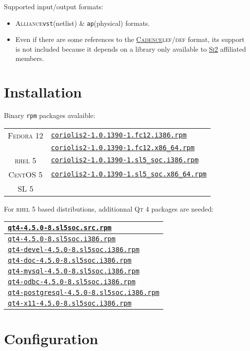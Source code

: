 \documentclass[11pt]{article}
\newcommand {\SiII}               {\href{http://www.si2.org/}{\textsc{Si2}}\xspace}
\newcommand {\Cadence}            {\href{http://www.cadence.com/}{\textsc{Cadence}}\xspace}
\newcommand {\LEFDEF}             {\textsc{lef/def}\xspace}
\newcommand {\RHELV}              {\textsc{rhel 5}\xspace}
\newcommand {\CentOSV}            {\textsc{CentOS 5}\xspace}
\newcommand {\SLV}                {\textsc{SL 5}\xspace}
\newcommand {\FedoraXII}          {\textsc{Fedora 12}\xspace}
\newcommand {\QtIV}               {\textsc{Qt 4}\xspace}
\newcommand {\rpm}                {\texttt{rpm}\xspace}
\newcommand {\Alliance}           {\textsc{Alliance}\xspace}
\newcommand {\vst}                {\texttt{vst}\xspace}
\newcommand {\ap}                 {\texttt{ap}\xspace}
\newcommand {\coriolisIIfcXIIirpm}%
     {\href{ftp://asim.lip6.fr/pub/coriolis/2.0/coriolis2-1.0.1390-1.fc12.i386.rpm}%
      {\texttt{coriolis2-1.0.1390-1.fc12.i386.rpm}\xspace}}
\newcommand {\coriolisIIfcXIIxrpm}%
     {\href{ftp://asim.lip6.fr/pub/coriolis/2.0/coriolis2-1.0.1390-1.fc12.x86\_64.rpm}%
      {\texttt{coriolis2-1.0.1390-1.fc12.x86\_64.rpm}\xspace}}
\newcommand {\coriolisIIslVirpm}%
     {\href{ftp://asim.lip6.fr/pub/coriolis/2.0/coriolis2-1.0.1390-1.sl5\_soc.i386.rpm}%
      {\texttt{coriolis2-1.0.1390-1.sl5\_soc.i386.rpm}\xspace}}
\newcommand {\coriolisIIslVxrpm}%
     {\href{ftp://asim.lip6.fr/pub/coriolis/2.0/coriolis2-1.0.1390-1.sl5\_soc.x86\_64.rpm}%
      {\texttt{coriolis2-1.0.1390-1.sl5\_soc.x86\_64.rpm}\xspace}}
\newcommand {\qtIVsrpm}%
     {\href{http://ftp.lip6.fr/pub/linux/distributions/slsoc/5x/SLSoC/SRPMS/SL/qt4-4.5.0-8.sl5soc.src.rpm}%
      {\texttt{qt4-4.5.0-8.sl5soc.src.rpm}\xspace}}
\newcommand {\qtIVirpm}%
     {\href{http://ftp.lip6.fr/pub/linux/distributions/slsoc/5x/i386/i386/SL/qt4-4.5.0-8.sl5soc.i386.rpm}%
      {\texttt{qt4-4.5.0-8.sl5soc.i386.rpm}\xspace}}
\newcommand {\qtIVdevelirpm}%
     {\href{http://ftp.lip6.fr/pub/linux/distributions/slsoc/5x/i386/i386/SL/qt4-devel-4.5.0-8.sl5soc.i386.rpm}%
      {\texttt{qt4-devel-4.5.0-8.sl5soc.i386.rpm}\xspace}}
\newcommand {\qtIVdocirpm}%
     {\href{http://ftp.lip6.fr/pub/linux/distributions/slsoc/5x/i386/i386/SL/qt4-doc-4.5.0-8.sl5soc.i386.rpm}%
      {\texttt{qt4-doc-4.5.0-8.sl5soc.i386.rpm}\xspace}}
\newcommand {\qtIVmysqlirpm}%
     {\href{http://ftp.lip6.fr/pub/linux/distributions/slsoc/5x/i386/i386/SL/qt4-mysql-4.5.0-8.sl5soc.i386.rpm}%
      {\texttt{qt4-mysql-4.5.0-8.sl5soc.i386.rpm}\xspace}}
\newcommand {\qtIVodbcirpm}%
     {\href{http://ftp.lip6.fr/pub/linux/distributions/slsoc/5x/i386/i386/SL/qt4-odbc-4.5.0-8.sl5soc.i386.rpm}%
      {\texttt{qt4-odbc-4.5.0-8.sl5soc.i386.rpm}\xspace}}
\newcommand {\qtIVpostgresqlirpm}%
     {\href{http://ftp.lip6.fr/pub/linux/distributions/slsoc/5x/i386/i386/SL/qt4-postgresql-4.5.0-8.sl5soc.i386.rpm}%
      {\texttt{qt4-postgresql-4.5.0-8.sl5soc.i386.rpm}\xspace}}
\newcommand {\qtIVxXIirpm}%
     {\href{http://ftp.lip6.fr/pub/linux/distributions/slsoc/5x/i386/i386/SL/qt4-x11-4.5.0-8.sl5soc.i386.rpm}%
      {\texttt{qt4-x11-4.5.0-8.sl5soc.i386.rpm}\xspace}}
\begin{document}
 \noindent Supported input/output formats:
 \begin{itemize}
   \item \Alliance \vst (netlist) \& \ap (physical) formats.
   \item Even if there are some references to the \Cadence \LEFDEF format, its
         support is not included because it depends on a library only available
         to \SiII affiliated members.
 \end{itemize}


 \section{Installation}

 Binary \rpm packages avalaible:
 \begin{center}
 \begin{tabular}{|c|l|}
   \hline
   \FedoraXII & \coriolisIIfcXIIirpm  \\
              & \coriolisIIfcXIIxrpm  \\
   \hline
   \RHELV     & \coriolisIIslVirpm  \\
   \CentOSV   & \coriolisIIslVxrpm  \\
   \SLV       &                     \\
   \hline
 \end{tabular}
 \end{center}
 For \RHELV based distributions, additionnal \QtIV packages are needed:

 \begin{center}
 \begin{tabular}{|l|}
   \hline
   \qtIVsrpm           \\
   \hline
   \hline
   \qtIVirpm           \\
   \qtIVdevelirpm      \\
   \qtIVdocirpm        \\
   \qtIVmysqlirpm      \\
   \qtIVodbcirpm       \\
   \qtIVpostgresqlirpm \\
   \qtIVxXIirpm        \\
   \hline
 \end{tabular}
 \end{center}

 \section{Configuration}
\end{document}
